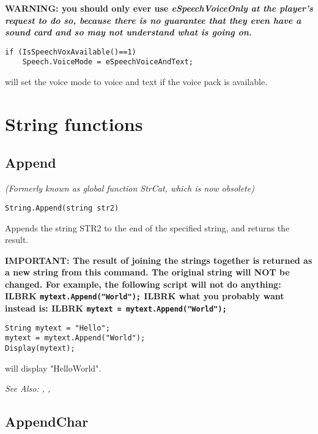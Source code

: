 \bf{WARNING:} you should only ever use \it{eSpeechVoiceOnly} at the player's request to
do so, because there is no guarantee that they even have a sound card and so may
not understand what is going on.

\begin{verbatim}
if (IsSpeechVoxAvailable()==1)
    Speech.VoiceMode = eSpeechVoiceAndText;
\end{verbatim}
will set the voice mode to voice and text if the voice pack is available.



\section{String functions}%


\subsection{Append}\label{String.Append}%

\it{(Formerly known as global function StrCat, which is now obsolete)}

\begin{verbatim}
String.Append(string str2)
\end{verbatim}
Appends the string STR2 to the end of the specified string, and returns the result.

\bf{IMPORTANT:} The result of joining the strings together is returned as a new
string from this command. The original string will \bf{NOT} be changed. For
example, the following script will not do anything: ILBRK
\verb$mytext.Append("World");$ ILBRK
what you probably want instead is: ILBRK
\verb$mytext = mytext.Append("World");$

\begin{verbatim}
String mytext = "Hello";
mytext = mytext.Append("World");
Display(mytext);
\end{verbatim}
will display "HelloWorld".

\it{See Also:} ,
, 


\subsection{AppendChar}\label{String.AppendChar}%

